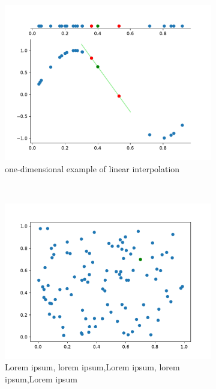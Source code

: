 \begin{figure}[h] %
	\centering
	\begin{subfigure}[t]{0.5\textwidth}
		\centering
		\includegraphics[width=\linewidth]{images/vis1d.pdf}
		\caption{one-dimensional example of linear interpolation}
		\label{fig:one-dim-interpolation}
	\end{subfigure}%
	~ 
	\begin{subfigure}[t]{0.5\textwidth}
		\centering
		\includegraphics[width=\linewidth]{images/vis2d1.pdf}
		\caption{Lorem ipsum, lorem ipsum,Lorem ipsum, lorem ipsum,Lorem ipsum}
		\label{fig:3dinterpolate-1}
	\end{subfigure}
	\caption{}
	
\end{figure}

